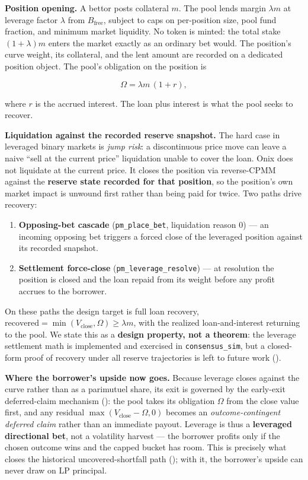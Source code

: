 \documentclass{ledger}
\theoremstyle{plain}
\theoremstyle{remark}
\begin{document}
\textbf{Position opening.} A bettor posts collateral $m$. The pool lends margin
$\lambda m$ at leverage factor $\lambda$ from $B_{\text{free}}$, subject to caps
on per-position size, pool fund fraction, and minimum market liquidity. No token
is minted: the total stake $(1+\lambda)m$ enters the market exactly as an
ordinary bet would. The position's curve weight, its collateral, and the lent
amount are recorded on a dedicated position object. The pool's obligation on the
position is

\[
\Omega = \lambda m \,(1 + r),
\]

where $r$ is the accrued interest. The loan plus interest is what the pool seeks
to recover.

\textbf{Liquidation against the recorded reserve snapshot.} The hard case in
leveraged binary markets is \emph{jump risk}: a discontinuous price move can
leave a naive ``sell at the current price'' liquidation unable to cover the
loan. Onix does not liquidate at the current price. It closes the position via
reverse-CPMM against the \textbf{reserve state recorded for that position}, so
the position's own market impact is unwound first rather than being paid for
twice. Two paths drive recovery:

\begin{enumerate}
  \item \textbf{Opposing-bet cascade} (\texttt{pm\_place\_bet}, liquidation
  reason 0) --- an incoming opposing bet triggers a forced close of the
  leveraged position against its recorded snapshot.
  \item \textbf{Settlement force-close} (\texttt{pm\_leverage\_resolve}) --- at
  resolution the position is closed and the loan repaid from its weight before
  any profit accrues to the borrower.
\end{enumerate}

On these paths the design target is full loan recovery, $\text{recovered} =
\min(V_{\text{close}}, \Omega) \ge \lambda m$, with the realized loan-and-interest
returning to the pool. We state this as a \textbf{design property, not a
theorem}: the leverage settlement math is implemented and exercised in
\texttt{consensus\_sim}, but a closed-form proof of recovery under all reserve
trajectories is left to future work ().

\textbf{Where the borrower's upside now goes.} Because leverage closes against
the curve rather than as a parimutuel share, its exit is governed by the
early-exit deferred-claim mechanism (): the pool takes its
obligation $\Omega$ from the close value first, and any residual $\max(V_{\text{close}}
- \Omega, 0)$ becomes an \emph{outcome-contingent deferred claim} rather than an
immediate payout. Leverage is thus a \textbf{leveraged directional bet}, not a
volatility harvest --- the borrower profits only if the chosen outcome wins and
the capped bucket has room. This is precisely what closes the historical
uncovered-shortfall path (); with it, the borrower's upside
can never draw on LP principal.
\end{document}
